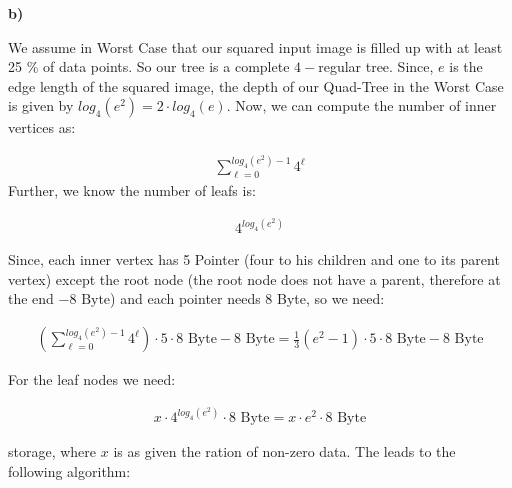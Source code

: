 \documentclass[english, fontsize=12pt, paper=a4, twoside=false, draft=true, pagesize=auto, version=last, DIV=16]{scrartcl}
\theoremstyle{break}
\begin{document}
\textbf{b)} \par
We assume in Worst Case that our squared input image is filled up with at least 25 \% of data points. So our tree is a complete $4-$regular tree. Since, $e$ is the edge length of the squared image, the depth of our Quad-Tree in the Worst Case is given by $log_4(e^2) = 2 \cdot log_4(e)$. Now, we can compute the number of inner vertices as: \par
\vspace*{-3mm}
\begin{equation}
\begin{aligned}
\sum\limits_{\ell = 0}^{log_4(e^2) - 1} 4^\ell
\end{aligned}
\end{equation}
Further, we know the number of leafs is: \par
\vspace*{-3mm}
\begin{equation}
\begin{aligned}
4^{log_4(e^2)}
\end{aligned}
\end{equation} \par
Since, each inner vertex has 5 Pointer (four to his children and one to its parent vertex) except the root node (the root node does not have a parent, therefore at the end $-8 \text{ Byte}$) and each pointer needs 8 Byte, so we need: \par
\vspace*{-3mm}
\begin{equation}
\begin{aligned}
\left( \sum\limits_{\ell = 0}^{log_4(e^2) - 1} 4^\ell \right) \cdot 5 \cdot 8 \text{ Byte} - 8 \text{ Byte}= \frac{1}{3}\left( e^2 - 1 \right) \cdot 5 \cdot 8 \text{ Byte} - 8 \text{ Byte}
\end{aligned}
\end{equation} \par
For the leaf nodes we need: \par
\vspace*{-3mm}
\begin{equation}
\begin{aligned}
x \cdot 4^{log_4(e^2)} \cdot 8 \text{ Byte} = x \cdot e^2 \cdot 8 \text{ Byte}
\end{aligned}
\end{equation} \par
storage, where $x$ is as given the ration of non-zero data. The leads to the following algorithm: \par
\end{document}
